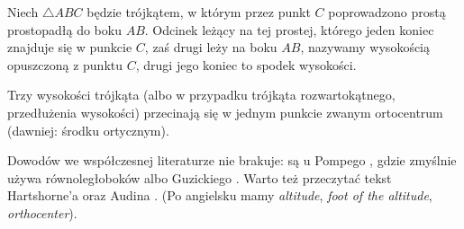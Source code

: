 \begin{definition}[wysokość]
%
    Niech $\triangle ABC$ będzie trójkątem, w którym przez punkt $C$ poprowadzono prostą prostopadłą do boku $AB$.
    Odcinek leżący na tej prostej, którego jeden koniec znajduje się w punkcie $C$, zaś drugi leży na boku $AB$, nazywamy wysokością opuszczoną z punktu $C$, drugi jego koniec to spodek wysokości.
\end{definition}


\begin{proposition}
\label{wysokosci_przecinaja_sie}%
	Trzy wysokości trójkąta (albo w przypadku trójkąta rozwartokątnego, przedłużenia wysokości) przecinają się w jednym punkcie zwanym ortocentrum (dawniej: środku ortycznym).
%
\end{proposition}

Dowodów we współczesnej literaturze nie brakuje: są u Pompego \cite[s. 38]{pompe_2022}, gdzie zmyślnie używa równoległoboków albo Guzickiego \cite[s. 218]{guzicki_2021}.
Warto też przeczytać tekst Hartshorne'a \cite[s. 54]{hartshorne2000} oraz Audina \cite[s. 61]{audin_2003}.
(Po angielsku mamy \emph{altitude}, \emph{foot of the altitude}, \emph{orthocenter}).